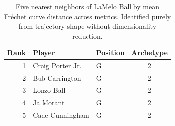 \begin{table}[htbp]
  \centering\small
  \begin{tabular}{rllc}
    \toprule
    Rank & Player & Position & Archetype \\
    \midrule
    1 & Craig Porter Jr. & G & 2 \\
    2 & Bub Carrington & G & 2 \\
    3 & Lonzo Ball & G & 2 \\
    4 & Ja Morant & G & 2 \\
    5 & Cade Cunningham & G & 2 \\
    \bottomrule
  \end{tabular}
  \caption{Five nearest neighbors of LaMelo Ball by mean Fr\'{e}chet curve distance across metrics. Identified purely from trajectory shape without dimensionality reduction.}
  \label{tab:LaMelo_Ball_frechet_curve_neighbors}
\end{table}

